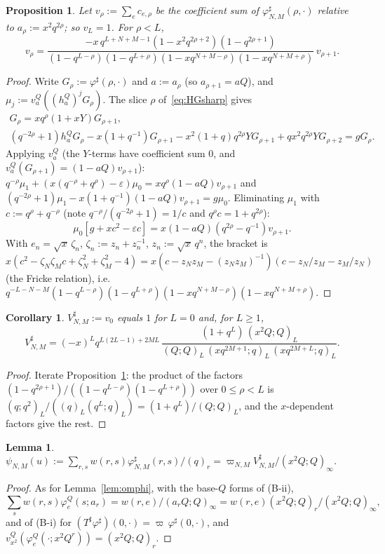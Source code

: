 \documentclass[11pt]{amsart}
\newtheorem{proposition}[theorem]{Proposition}
\newtheorem{lemma}[theorem]{Lemma}
\newtheorem{corollary}[theorem]{Corollary}
\theoremstyle{definition}
\numberwithin{equation}{section}
\begin{document}
\begin{proposition}\label{prop:vsharp}
Let $v_\rho:=\sum_ec_{e,\rho}$ be the coefficient sum of $\varphi^\sharp_{N,M}(\rho,\cdot)$ relative to $a_\rho:=x^2q^{2\rho}$; so
$v_L=1$. For $\rho<L$,
\[
v_\rho=\frac{-x\,q^{L+N+M-1}(1-x^2q^{2\rho+2})(1-q^{2\rho+1})}{(1-q^{L-\rho})(1-q^{L+\rho})(1-xq^{N+M-\rho})(1-xq^{N+M+\rho})}\,v_{\rho+1}.
\]
\end{proposition}
\begin{proof}
Write $G_\rho:=\varphi^\sharp(\rho,\cdot)$ and $a:=a_\rho$ (so $a_{\rho+1}=aQ$), and $\mu_j:=v^Q_a((h^Q_a)^jG_\rho)$. The slice $\rho$
of~\eqref{eq:HGsharp} gives
\begin{gather*}
[q^{-\rho}h^Q_a+x(q^{-\rho}+q^\rho)-\varepsilon]G_\rho=xq^\rho(1+xY)G_{\rho+1},\\
(q^{-2\rho}+1)h^Q_aG_\rho-x(1+q^{-1})G_{\rho+1}-x^2(1+q)q^{2\rho}YG_{\rho+1}+qx^2q^{2\rho}YG_{\rho+2}=gG_\rho .
\end{gather*}
Applying $v^Q_a$ (the $Y$-terms have coefficient sum $0$, and $v^Q_a(G_{\rho+1})=(1-aQ)v_{\rho+1}$):
$q^{-\rho}\mu_1+(x(q^{-\rho}+q^\rho)-\varepsilon)\mu_0=xq^\rho(1-aQ)v_{\rho+1}$ and
$(q^{-2\rho}+1)\mu_1-x(1+q^{-1})(1-aQ)v_{\rho+1}=g\mu_0$. Eliminating $\mu_1$ with $c:=q^\rho+q^{-\rho}$ (note
$q^{-\rho}/(q^{-2\rho}+1)=1/c$ and $q^\rho c=1+q^{2\rho}$):
\[\mu_0[g+xc^2-\varepsilon c]=x(1-aQ)(q^{2\rho}-q^{-1})v_{\rho+1}.\]
With $e_n=\sqrt x\,\zeta_n$, $\zeta_n:=z_n+z_n^{-1}$, $z_n:=\sqrt x\,q^n$, the bracket is
$x(c^2-\zeta_N\zeta_Mc+\zeta_N^2+\zeta_M^2-4)=x(c-z_Nz_M-(z_Nz_M)^{-1})(c-z_N/z_M-z_M/z_N)$ (the Fricke relation), i.e.\
$q^{-L-N-M}(1-q^{L-\rho})(1-q^{L+\rho})(1-xq^{N+M-\rho})(1-xq^{N+M+\rho})$.
\end{proof}

\begin{corollary}\label{cor:Vsharp}
$V^\sharp_{N,M}:=v_0$ equals $1$ for $L=0$ and, for $L\ge1$,
\[
V^\sharp_{N,M}=(-x)^Lq^{L(2L-1)+2ML}\,\frac{(1+q^L)\,(x^2Q;Q)_L}{(Q;Q)_L\,(xq^{2M+1};q)_L\,(xq^{2M+L};q)_L}.
\]
\end{corollary}
\begin{proof}
Iterate Proposition~\ref{prop:vsharp}: the product of the factors $(1-q^{2\rho+1})/((1-q^{L-\rho})(1-q^{L+\rho}))$ over
$0\le\rho<L$ is $(q;q^2)_L/((q)_L(q^L;q)_L)=(1+q^L)/(Q;Q)_L$, and the $x$-dependent factors give the rest.
\end{proof}

\begin{lemma}\label{lem:psiu}
$\psi_{N,M}(u):=\sum_{r,s}w(r,s)\varphi^\sharp_{N,M}(r,s)/(q)_r=\varpi_{N,M}V^\sharp_{N,M}/(x^2Q;Q)_\infty$.
\end{lemma}
\begin{proof}
As for Lemma~\ref{lem:omphi}, with the base-$Q$ forms of (B-ii),
\[\textstyle\sum_sw(r,s)\varphi^Q_e(s;a_r)=w(r,e)/(a_rQ;Q)_\infty=w(r,e)(x^2Q;Q)_r/(x^2Q;Q)_\infty,\]
and of (B-i) for $(T^\sharp\varphi^\sharp)(0,\cdot)=\varpi\,\varphi^\sharp(0,\cdot)$, and $v^Q_{x^2}(\varphi^Q_e(\cdot;x^2Q^r))=(x^2Q;Q)_r$.
\end{proof}
\end{document}
